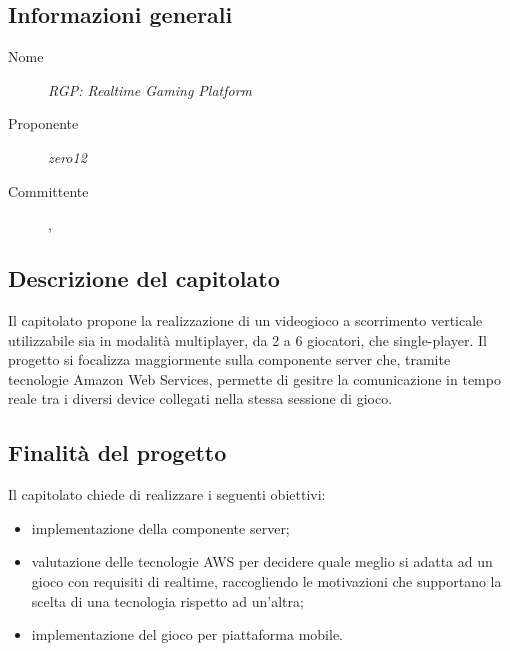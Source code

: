 
  \subsection{Informazioni generali}
  \begin{description}
    \item[Nome] \textit{RGP: Realtime Gaming Platform}
    \item[Proponente] \textit{zero12}
    \item[Committente] \VT{}, \CR{}
  \end{description}

  \subsection{Descrizione del capitolato}
Il capitolato propone la realizzazione di un videogioco a scorrimento verticale utilizzabile sia in modalità multiplayer, da 2 a 6 giocatori, che single-player. Il progetto si focalizza maggiormente sulla componente server che, tramite tecnologie Amazon Web Services, permette di gesitre la comunicazione in tempo reale tra i diversi device collegati nella stessa sessione di gioco.

  \subsection{Finalità del progetto}
Il capitolato chiede di realizzare i seguenti obiettivi:
  \begin{itemize}
    \item implementazione della componente server;
    \item valutazione delle tecnologie AWS per decidere quale meglio si adatta ad un gioco con requisiti di realtime, raccogliendo le motivazioni che supportano la scelta di una tecnologia rispetto ad un'altra;
    \item implementazione del gioco per piattaforma mobile.
  \end{itemize}

